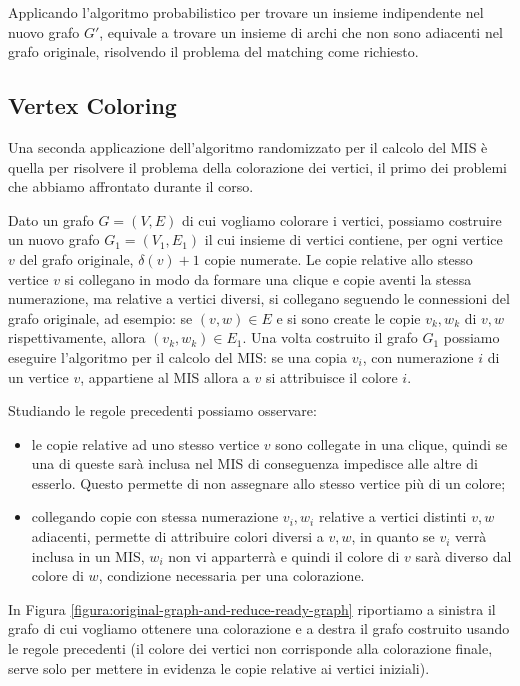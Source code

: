 \documentclass{article}
\begin{document}
Applicando l'algoritmo probabilistico per trovare un insieme indipendente 
nel nuovo grafo $G'$, equivale a trovare un insieme di archi che non sono 
adiacenti nel
grafo originale, risolvendo il problema del matching come richiesto.

\subsection{Vertex Coloring}
Una seconda applicazione dell'algoritmo randomizzato per il calcolo 
del MIS \`e quella per risolvere
il problema della colorazione dei vertici, il primo dei problemi che 
abbiamo affrontato durante il corso. 

Dato un grafo $G = (V, E)$ di cui
vogliamo colorare i vertici, possiamo costruire un nuovo grafo 
$G_1 = (V_1, E_1)$
il cui insieme di vertici contiene, per ogni vertice $v$ del grafo
originale, $\delta(v) + 1$ copie numerate. 
Le copie relative allo stesso 
vertice $v$ si collegano in modo da formare una clique e
copie aventi la stessa numerazione, ma relative a vertici diversi, si
collegano seguendo le
connessioni del grafo originale, ad esempio: se $(v,w) \in E$ e si 
sono create le copie $v_k,w_k$ di $v,w$ rispettivamente, 
allora $(v_k,w_k) \in E_1$. 
Una volta costruito il grafo $G_1$ possiamo eseguire l'algoritmo per
il calcolo del MIS: se una copia $v_i$, con numerazione $i$ di un vertice $v$,
appartiene al MIS allora a $v$ si attribuisce il colore $i$.

Studiando le regole precedenti possiamo osservare:
\begin{itemize}
    \item   le copie relative ad uno stesso vertice $v$ sono collegate
            in una clique, quindi se una di queste sar\`a inclusa nel MIS
            di conseguenza impedisce alle altre di esserlo. Questo
            permette di non assegnare allo stesso vertice pi\`u di 
            un colore;
    \item   collegando copie con stessa numerazione $v_i, w_i$ 
            relative a vertici distinti $v,w$ adiacenti,
            permette di attribuire colori diversi a $v,w$, 
            in quanto se $v_i$ verr\`a inclusa in un MIS,
            $w_i$ non vi apparterr\`a e quindi il colore di $v$ sar\`a 
            diverso dal colore di $w$, condizione necessaria per una 
            colorazione.
\end{itemize}

In Figura 
\ref{figura:original-graph-and-reduce-ready-graph} riportiamo a sinistra
il grafo di cui vogliamo ottenere una colorazione e a destra il grafo
costruito usando le regole precedenti (il colore dei vertici non corrisponde
alla colorazione finale, serve solo per mettere in evidenza le copie
relative ai vertici iniziali).
\end{document}
